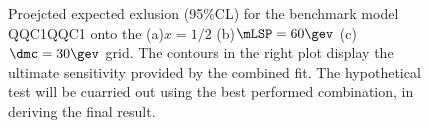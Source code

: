 \begin{figure}[h]
  \centering
    \caption{Proejcted expected exlusion (95$\%$CL) for the benchmark model QQC1QQC1 onto the (a)$x=1/2$ (b)$\mLSP=60\gev$ (c) $\dmc=30\gev$ grid. The contours in the right plot display the ultimate sensitivity provided by the combined fit. The hypothetical test will be cuarried out using the best performed combination, in deriving the final result. }
    \label{fig::SRdefinition::expLimitQQC1QQC1}
\end{figure}

